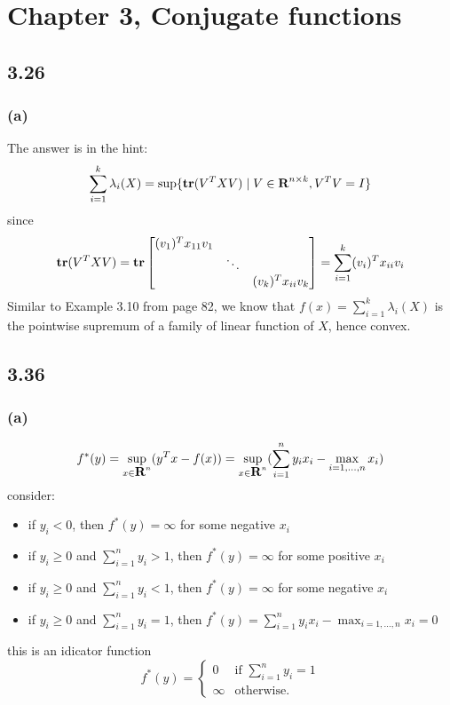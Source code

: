 \documentclass{article}
\newcommand{\reals}{{\mbox{\bf R}}}
\newcommand{\tr}{{\mbox{\bf tr}}}
\begin{document}
\section*{Chapter 3, Conjugate functions}	
\subsection*{3.26}
\subsubsection*{(a)}
The answer is in the hint:
\[\sum_{i = 1}^{k}\lambda_i(X)  = \sup \{ \tr (V^TXV) \mid V \in \reals^{n \times k}, V^TV = I\}\]
since 
\[ \tr (V^TXV) = \tr \begin{bmatrix}
(v_1)^Tx_{11}v_1 & & \\
 & \ddots& \\
 &&(v_k)^Tx_{ii}v_k
\end{bmatrix} = \sum_{i =1}^k(v_i)^Tx_{ii}v_i\]
Similar to Example 3.10 from page 82, we know that $f(x) = \sum_{i = 1}^{k}\lambda_i(X)$  is the pointwise supremum of a family of linear function of $X$, hence convex.
\subsection*{3.36}
\subsubsection*{(a)}
\[f^*(y) = \sup_{x \in \reals^n} (y^Tx - f(x))  = \sup_{x \in \reals^n} (\sum_{i=1}^ny_ix_i - \max_{i = 1,\ldots, n}x_i)\]
consider:
\begin{itemize}
\item if $y_i < 0$, then $f^{*}(y)  = \infty$ for some negative $x_i$ 
\item if $y_i \ge 0$ and $\sum_{i=1}^ny_i >1$, then $f^{*}(y)  = \infty$ for some positive $x_i$ 
\item if $y_i \ge 0$ and $\sum_{i=1}^ny_i <1$, then $f^{*}(y)  = \infty$ for some negative $x_i$ 
\item if $y_i \ge 0$ and $\sum_{i=1}^ny_i =1$, then $ f^{*}(y) = \sum_{i=1}^ny_ix_i -  \max_{i = 1,\ldots, n}x_i = 0$ 
\end{itemize}
this is an idicator function 
\[  f^{*}(y) = \begin{cases}
            0 & \mbox{if } \sum_{i=1}^ny_i =1 \\
            \infty &  \mbox{otherwise.}
        \end{cases}\]
\end{document}
